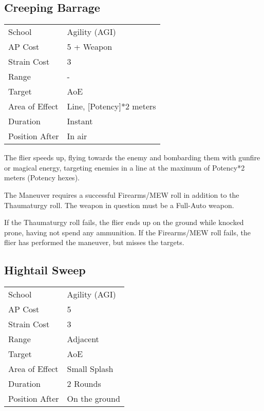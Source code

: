 \documentclass[11pt,a4paper,twocolumn]{book}
\begin{document}


\medskip

\subsection*{Creeping Barrage}
{
	\begin{tabu} to 75mm{| X[l,4] | X[l,7] |}
		\hline
		School 			& Agility (AGI) 	\\
		AP Cost	      	& 5 + Weapon 		\\
		Strain Cost     & 3 				\\
		Range     		& - 				\\
		Target      	& AoE 				\\
		Area of Effect  & Line, [Potency]*2 meters 	 	\\
		Duration     	& Instant 	 		\\
		Position After  & In air 			\\ \hline
	\end{tabu}
	
}

\medskip

The flier speeds up, flying towards the enemy and bombarding them with gunfire or magical energy, targeting enemies in a line at the maximum of Potency*2 meters (Potency hexes).

The Maneuver requires a successful Firearms/MEW roll in addition to the Thaumaturgy roll. The weapon in question must be a Full-Auto weapon. 

If the Thaumaturgy roll fails, the flier ends up on the ground while knocked prone, having not spend any ammunition. If the Firearms/MEW roll fails, the flier has performed the maneuver, but misses the targets.


\subsection*{Hightail Sweep}
{
	\begin{tabu} to 75mm{| X[l,4] | X[l,7] |}
		\hline
		School 			& Agility (AGI) 	\\
		AP Cost	      	& 5 				\\
		Strain Cost     & 3 				\\
		Range     		& Adjacent 				\\
		Target      	& AoE 				\\
		Area of Effect  & Small Splash 	 	\\
		Duration     	& 2 Rounds 	 			\\
		Position After  & On the ground 	\\ \hline
	\end{tabu}
	
}
\end{document}
